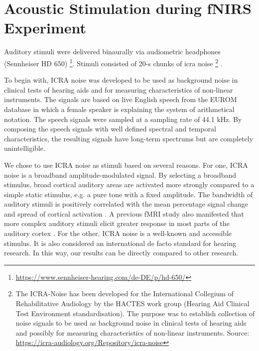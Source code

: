 \section {Acoustic Stimulation during fNIRS Experiment}
Auditory stimuli were delivered binaurally via audiometric headphones (Sennheiser HD 650) \footnote {\url{https://www.sennheiser-hearing.com/de-DE/p/hd-650/}}. Stimuli consisted of 20-s chunks of \acrshort{icra} noise \footnote {The ICRA-Noise has been developed for the International Collegium of Rehabilitative Audiology by the HACTES work group (Hearing Aid Clinical Test Environment standardisation). The purpose was to establish collection of noise signals to be used as background noise in clinical tests of hearing aids and possibly for measuring characteristics of non-linear instruments. Source: \url{https://icra-audiology.org/Repository/icra-noise}} \citep {Dreschler}. 

To begin with, ICRA noise was developed to be used as background noise in clinical tests of hearing aids and for measuring characteristics of non-linear instruments. The signals are based on live English speech from the EUROM database \citep {chanEUROM} in which a female speaker is explaining the system of arithmetical notation. The speech signals were sampled at a sampling rate of 44.1 kHz. By composing the speech signals with well defined spectral and temporal characteristics, the resulting signals have long-term spectrums but are completely unintelligible. 
 
We chose to use ICRA noise as stimuli based on several reasons. For one, ICRA noise is a broadband amplitude-modulated signal. By selecting a broadband stimulus, broad cortical auditory areas are activated more strongly compared to a simple static stimulus, e.g. a pure tone with a fixed amplitude. The bandwidth of auditory stimuli is positively correlated with the mean percentage signal change and spread of cortical activation \citep {Hall}. A previous fMRI study also manifested that more complex auditory stimuli elicit greater response in most parts of the auditory cortex \citep {Belin2002}. For the other, ICRA noise is a well-known and accessible stimulus. It is also considered an international de facto standard for hearing research. In this way, our results can be directly compared to other research.
 
